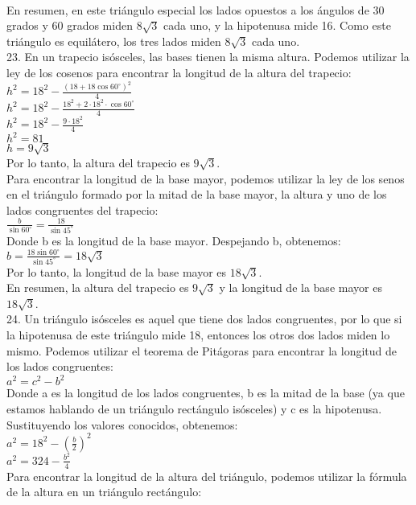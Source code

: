 \documentclass{article}
\begin{document}
\\
En resumen, en este triángulo especial los lados opuestos a los ángulos de 30 grados y 60 grados miden $8\sqrt{3}$ cada uno, y la hipotenusa mide 16. Como este triángulo es equilátero, los tres lados miden $8\sqrt{3}$ cada uno.\\
{\Large 23.}
En un trapecio isósceles, las bases tienen la misma altura. Podemos utilizar la ley de los cosenos para encontrar la longitud de la altura del trapecio:\\
$h^2 = 18^2 - \frac{(18+18\cos{60^\circ})^2}{4}$\\
$h^2 = 18^2 - \frac{18^2+2\cdot18^2\cdot\cos{60^\circ}}{4}$\\
$h^2 = 18^2 - \frac{9\cdot18^2}{4}$\\
$h^2 = 81$\\
$h = 9\sqrt{3}$\\
Por lo tanto, la altura del trapecio es $9\sqrt{3}$.\\
Para encontrar la longitud de la base mayor, podemos utilizar la ley de los senos en el triángulo formado por la mitad de la base mayor, la altura y uno de los lados congruentes del trapecio:\\
$\frac{b}{\sin{60^\circ}} = \frac{18}{\sin{45^\circ}}$\\
Donde b es la longitud de la base mayor. Despejando b, obtenemos:\\
$b = \frac{18\sin{60^\circ}}{\sin{45^\circ}} = 18\sqrt{3}$\\
Por lo tanto, la longitud de la base mayor es $18\sqrt{3}$.\\
En resumen, la altura del trapecio es $9\sqrt{3}$ y la longitud de la base mayor es $18\sqrt{3}$.\\
{\Large 24.}
Un triángulo isósceles es aquel que tiene dos lados congruentes, por lo que si la hipotenusa de este triángulo mide 18, entonces los otros dos lados miden lo mismo. Podemos utilizar el teorema de Pitágoras para encontrar la longitud de los lados congruentes:\\
$a^2 = c^2 - b^2$\\
Donde a es la longitud de los lados congruentes, b es la mitad de la base (ya que estamos hablando de un triángulo rectángulo isósceles) y c es la hipotenusa. Sustituyendo los valores conocidos, obtenemos:\\
$a^2 = 18^2 - \left(\frac{b}{2}\right)^2$\\
$a^2 = 324 - \frac{b^2}{4}$\\
Para encontrar la longitud de la altura del triángulo, podemos utilizar la fórmula de la altura en un triángulo rectángulo:\\
\end{document}
